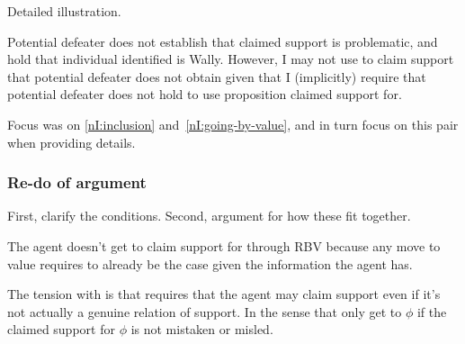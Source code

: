 \begin{note}[Summary]
  Detailed illustration.

  Potential defeater does not establish that claimed support is problematic, and hold that individual identified is Wally.
  However, I may not use to claim support that potential defeater does not obtain given that I (implicitly) require that potential defeater does not hold to use proposition claimed support for.

  Focus was on \ref{nI:inclusion} and~\ref{nI:going-by-value}, and in turn focus on this pair when providing details.
\end{note}


\newpage

\subsubsection{Re-do of \nI{} argument}
\label{sec:re-do-ni}


\begin{note}[Structure]
  First, clarify the conditions.
  Second, argument for how these fit together.
\end{note}

\begin{note}
  The agent doesn’t get to claim support for through RBV because any move to value requires to already be the case given the information the agent has.
\end{note}

\begin{note}
  The tension with \eiS{} is that \eiS{} requires that the agent may claim support even if it's not actually a genuine relation of support.
  In the sense that only get to \(\phi\) if the claimed support for \(\phi\) is not mistaken or misled.
\end{note}

